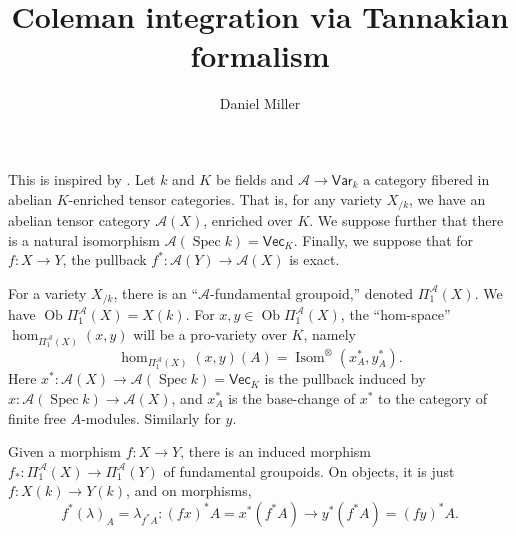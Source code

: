 \documentclass{article}
\title{Coleman integration via Tannakian formalism}
\author{Daniel Miller}
\DeclareMathOperator{\isom}{Isom}
\DeclareMathOperator{\ob}{Ob}
\DeclareMathOperator{\spec}{Spec}
\newcommand{\cA}{\mathcal{A}}
\newcommand{\var}{\mathsf{Var}}
\newcommand{\vect}{\mathsf{Vec}}
\begin{document}
\maketitle





This is inspired by \cite{besser-2002}. Let $k$ and $K$ be fields and 
$\cA\to \var_k$ a category fibered in abelian $K$-enriched tensor categories. 
That is, for any variety $X_{/k}$, we have an abelian tensor category 
$\cA(X)$, enriched over $K$. We suppose further that there is a natural 
isomorphism $\cA(\spec k)=\vect_K$. Finally, we suppose that for 
$f\colon X\to Y$, the pullback $f^\ast\colon \cA(Y)\to \cA(X)$ is exact. 

For a variety $X_{/k}$, there is an ``$\cA$-fundamental groupoid,'' denoted 
$\Pi_1^\cA(X)$. We have $\ob\Pi_1^\cA(X) = X(k)$. For 
$x,y\in \ob\Pi_1^\cA(X)$, the ``hom-space'' $\hom_{\Pi_1^\cA(X)}(x,y)$ will 
be a pro-variety over $K$, namely 
\[
	\hom_{\Pi_1^\cA(X)}(x,y)(A) = \isom^\otimes(x^\ast_A, y^\ast_A).
\]
Here $x^\ast\colon \cA(X)\to \cA(\spec k)=\vect_K$ is the pullback induced by 
$x\colon \cA(\spec k)\to \cA(X)$, and $x^\ast_A$ is the base-change of 
$x^\ast$ to the category of finite free $A$-modules. Similarly for $y$. 

Given a morphism $f\colon X\to Y$, there is an induced morphism 
$f_\ast\colon \Pi_1^\cA(X)\to \Pi_1^\cA(Y)$ of fundamental groupoids. On 
objects, it is just $f\colon X(k)\to Y(k)$, and on morphisms, 
\[
	f^\ast(\lambda)_A = \lambda_{f^\ast A}\colon (f x)^\ast A = x^\ast(f^\ast A) \to y^\ast(f^\ast A) = (f y)^\ast A .
\]





\printbibliography
\end{document}
